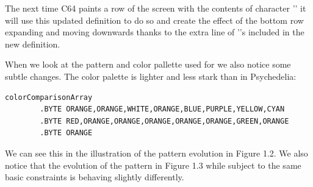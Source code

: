 The next time C64 paints a row of the screen with the contents of character '' it will use this updated definition to do so and create the 
effect of the bottom row expanding and moving downwards thanks to the extra line of ''s included in the new definition.

When we look at the pattern and color pallette used for we also notice some subtle changes. The color palette is lighter and less stark than in
Psychedelia:

\begin{lstlisting}[basicstyle=\ttfamily\tiny]
colorComparisonArray   
        .BYTE ORANGE,ORANGE,WHITE,ORANGE,BLUE,PURPLE,YELLOW,CYAN
        .BYTE RED,ORANGE,ORANGE,ORANGE,ORANGE,ORANGE,GREEN,ORANGE
        .BYTE ORANGE
\end{lstlisting}

We can see this in the illustration of the pattern evolution in Figure 1.2. We also notice that the evolution of the pattern in Figure 1.3 while
subject to the same basic constraints is behaving slightly differently.

